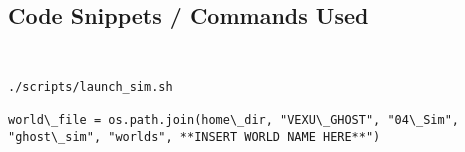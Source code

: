 

\subsection{Code Snippets / Commands Used}
\begin{lstlisting}
    
\end{lstlisting}
\begin{lstlisting}
./scripts/launch_sim.sh
    
world\_file = os.path.join(home\_dir, "VEXU\_GHOST", "04\_Sim", "ghost\_sim", "worlds", **INSERT WORLD NAME HERE**")
\end{lstlisting}


